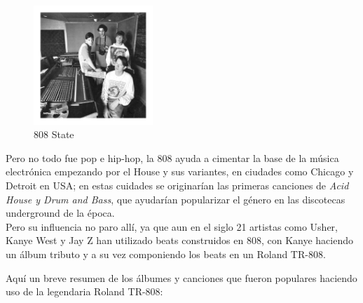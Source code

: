 \documentclass{article}
\begin{document}
\endgroup

\begingroup
\setlength{\intextsep}{0pt}%
\setlength{\columnsep}{0pt}%

\begin{figure}
    \centering
    \includegraphics[width=0.4\textwidth]{images/808state.jpg}
    \vspace{-5pt}
    \caption{808 State}
\end{figure}

Pero no todo fue pop e hip-hop, la 808 ayuda a cimentar la base de la música electrónica empezando por el House y sus variantes, en ciudades como Chicago y Detroit en USA; en estas cuidades se originarían las primeras canciones de \emph{Acid House y Drum and Bass}, que ayudarían popularizar el género en las discotecas underground de la época.\cite{808film}\\

Pero su influencia no paro allí, ya que aun en el siglo 21 artistas como Usher, Kanye West y Jay Z han utilizado beats construidos en 808, con Kanye haciendo un álbum tributo y a su vez componiendo los beats en un Roland TR-808.\cite{808film}\\

\endgroup

Aquí un breve resumen de los álbumes y canciones que fueron populares haciendo uso de la legendaria Roland TR-808:\\
\end{document}
